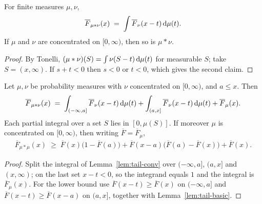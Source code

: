 \begin{lemma}
  \label{lem:tail-conv}
  \leanok
  For finite measures $\mu, \nu$,
  \begin{align*}
    \overline{F}_{\mu * \nu}(x) \; = \; \int \overline{F}_\nu(x - t) \, \mathrm{d} \mu(t) .
  \end{align*}
  If $\mu$ and $\nu$ are concentrated on $[0, \infty)$, then so is $\mu * \nu$.
\end{lemma}
\begin{proof}
  \leanok
  By Tonelli, $(\mu * \nu)(S) = \int \nu(S - t) \, \mathrm{d} \mu(t)$ for measurable $S$; take
  $S = (x, \infty)$. If $s + t < 0$ then $s < 0$ or $t < 0$, which gives the second claim.
\end{proof}

\begin{lemma}
  \label{lem:tail-conv-split}
  \leanok
  Let $\mu, \nu$ be probability measures with $\nu$ concentrated on $[0, \infty)$, and $a \le x$.
  Then
  \begin{align*}
    \overline{F}_{\mu * \nu}(x) \; = \; \int_{(-\infty, a]} \overline{F}_\nu(x - t) \, \mathrm{d} \mu(t)
      + \int_{(a, x]} \overline{F}_\nu(x - t) \, \mathrm{d} \mu(t) + \overline{F}_\mu(x) .
  \end{align*}
  Each partial integral over a set $S$ lies in $[0, \mu(S)]$. If moreover $\mu$ is concentrated
  on $[0, \infty)$, then writing $\overline{F} = \overline{F}_\mu$,
  \begin{align*}
    \overline{F}_{\mu*\mu}(x) \; \ge \; \overline{F}(x) \big( 1 - \overline{F}(a) \big)
      + \overline{F}(x - a) \big( \overline{F}(a) - \overline{F}(x) \big) + \overline{F}(x) .
  \end{align*}
\end{lemma}
\begin{proof}
  \leanok
  Split the integral of Lemma~\ref{lem:tail-conv} over $(-\infty, a]$, $(a, x]$ and $(x, \infty)$;
  on the last set $x - t < 0$, so the integrand equals $1$ and the integral is $\overline{F}_\mu(x)$.
  For the lower bound use $\overline{F}(x - t) \ge \overline{F}(x)$ on $(-\infty, a]$ and
  $\overline{F}(x - t) \ge \overline{F}(x - a)$ on $(a, x]$, together with
  Lemma~\ref{lem:tail-basic}.
\end{proof}

